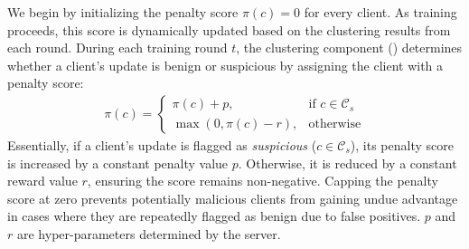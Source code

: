 We begin by initializing the penalty score \(\pi(c) = 0\) for every client. As training proceeds, this score is dynamically updated based on the clustering results from each round.
During each training round \( t \), the clustering component () determines whether a client's update is benign or suspicious by assigning the client with a penalty score:
\begin{align}
    \pi(c) =
    \begin{cases}
    \pi(c) + p, & \text{if } c \in \mathcal{C}_s\\
    \max(0, \pi(c) - r),              & \text{otherwise}
    \end{cases}
\end{align}
\newline
Essentially, if a client's update is flagged as \textit{suspicious} (\( c \in \mathcal{C}_s \)), its penalty score is increased by a constant penalty value \( p \). Otherwise, it is reduced by a constant reward value \( r \), ensuring the score remains non-negative. Capping the penalty score at zero prevents potentially malicious clients from gaining undue advantage in cases where they are repeatedly flagged as benign due to false positives. $p$ and $r$ are hyper-parameters determined by the server.

